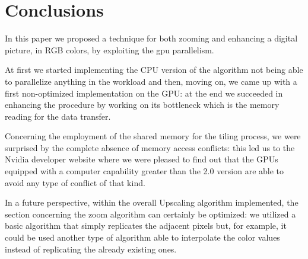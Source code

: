 \section{Conclusions}

In this paper we proposed a technique for both zooming and enhancing a digital picture, in RGB colors, by exploiting the gpu parallelism.

At first we started implementing the CPU version of the algorithm not being able to parallelize anything in the workload and then, moving on,
we came up with a first non-optimized implementation on the GPU: at the end we succeeded in enhancing the procedure by working on its bottleneck 
which is the memory reading for the data transfer.

Concerning the employment of the shared memory for the tiling process, we were surprised by the complete absence of memory access conflicts: 
this led us to the Nvidia developer website where we were pleased to find out that the GPUs equipped with a computer capability greater than the 2.0 version 
are able to avoid any type of conflict of that kind. 

In a future perspective, within the overall Upscaling algorithm implemented, the section concerning the zoom algorithm can certainly be optimized: 
we utilized a basic algorithm that simply replicates the adjacent pixels but, for example, 
it could be used another type of algorithm able to interpolate the color values instead of replicating the already existing ones.



